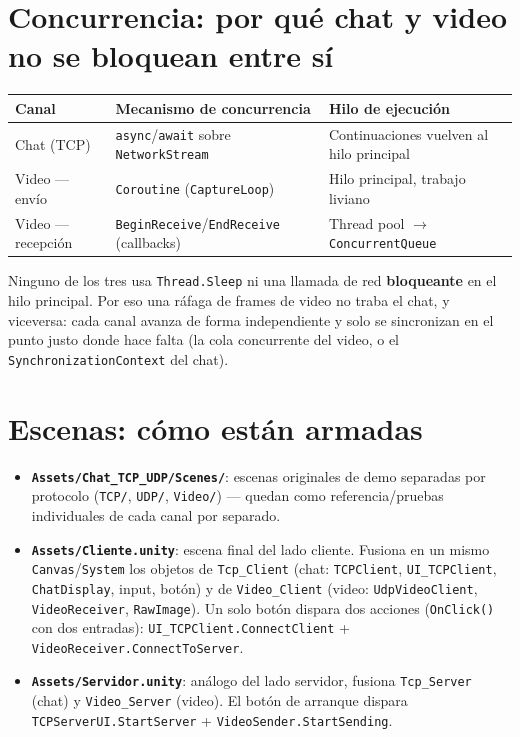\documentclass[11pt,a4paper]{article}
\begin{document}
\section{Concurrencia: por qué chat y video no se bloquean entre sí}
\label{sec:concurrencia}

\begin{table}[h]
\centering
\begin{tabular}{@{}lll@{}}
\toprule
\textbf{Canal} & \textbf{Mecanismo de concurrencia} & \textbf{Hilo de ejecución} \\
\midrule
Chat (TCP) & \texttt{async}/\texttt{await} sobre \texttt{NetworkStream} & Continuaciones vuelven al hilo principal \\
Video — envío & \texttt{Coroutine} (\texttt{CaptureLoop}) & Hilo principal, trabajo liviano \\
Video — recepción & \texttt{BeginReceive}/\texttt{EndReceive} (callbacks) & Thread pool $\rightarrow$ \texttt{ConcurrentQueue} \\
\bottomrule
\end{tabular}
\end{table}

Ninguno de los tres usa \texttt{Thread.Sleep} ni una llamada de red \textbf{bloqueante}
en el hilo principal. Por eso una ráfaga de frames de video no traba el
chat, y viceversa: cada canal avanza de forma independiente y solo se
sincronizan en el punto justo donde hace falta (la cola concurrente del
video, o el \texttt{SynchronizationContext} del chat).

\section{Escenas: cómo están armadas}

\begin{itemize}
  \item \textbf{\texttt{Assets/Chat\_TCP\_UDP/Scenes/}}: escenas originales de demo separadas por protocolo (\texttt{TCP/}, \texttt{UDP/}, \texttt{Video/}) — quedan como referencia/pruebas individuales de cada canal por separado.
  \item \textbf{\texttt{Assets/Cliente.unity}}: escena final del lado cliente. Fusiona en un mismo \texttt{Canvas}/\texttt{System} los objetos de \texttt{Tcp\_Client} (chat: \texttt{TCPClient}, \texttt{UI\_TCPClient}, \texttt{ChatDisplay}, input, botón) y de \texttt{Video\_Client} (video: \texttt{UdpVideoClient}, \texttt{VideoReceiver}, \texttt{RawImage}). Un solo botón dispara dos acciones (\texttt{OnClick()} con dos entradas): \texttt{UI\_TCPClient.ConnectClient} + \texttt{VideoReceiver.ConnectToServer}.
  \item \textbf{\texttt{Assets/Servidor.unity}}: análogo del lado servidor, fusiona \texttt{Tcp\_Server} (chat) y \texttt{Video\_Server} (video). El botón de arranque dispara \texttt{TCPServerUI.StartServer} + \texttt{VideoSender.StartSending}.
\end{itemize}
\end{document}
